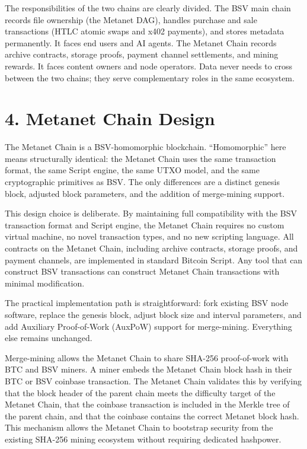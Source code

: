 \documentclass[11pt,a4paper]{article}
\begin{document}
The responsibilities of the two chains are clearly divided. The BSV main chain records file ownership (the Metanet DAG), handles purchase and sale transactions (HTLC atomic swaps and x402 payments), and stores metadata permanently. It faces end users and AI agents. The Metanet Chain records archive contracts, storage proofs, payment channel settlements, and mining rewards. It faces content owners and node operators. Data never needs to cross between the two chains; they serve complementary roles in the same ecosystem.

\section{4. Metanet Chain Design}

The Metanet Chain is a BSV-homomorphic blockchain. ``Homomorphic'' here means structurally identical: the Metanet Chain uses the same transaction format, the same Script engine, the same UTXO model, and the same cryptographic primitives as BSV. The only differences are a distinct genesis block, adjusted block parameters, and the addition of merge-mining support.

This design choice is deliberate. By maintaining full compatibility with the BSV transaction format and Script engine, the Metanet Chain requires no custom virtual machine, no novel transaction types, and no new scripting language. All contracts on the Metanet Chain, including archive contracts, storage proofs, and payment channels, are implemented in standard Bitcoin Script. Any tool that can construct BSV transactions can construct Metanet Chain transactions with minimal modification.

The practical implementation path is straightforward: fork existing BSV node software, replace the genesis block, adjust block size and interval parameters, and add Auxiliary Proof-of-Work (AuxPoW) support for merge-mining. Everything else remains unchanged.

Merge-mining allows the Metanet Chain to share SHA-256 proof-of-work with BTC and BSV miners. A miner embeds the Metanet Chain block hash in their BTC or BSV coinbase transaction. The Metanet Chain validates this by verifying that the block header of the parent chain meets the difficulty target of the Metanet Chain, that the coinbase transaction is included in the Merkle tree of the parent chain, and that the coinbase contains the correct Metanet block hash. This mechanism allows the Metanet Chain to bootstrap security from the existing SHA-256 mining ecosystem without requiring dedicated hashpower.
\end{document}

